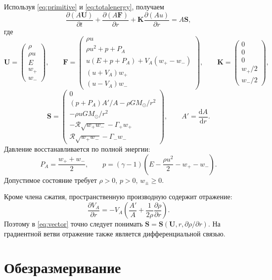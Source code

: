 \documentclass[11pt,a4paper]{article}
\newcommand{\PA}{P_A}
\newcommand{\VA}{V_A}
\newcommand{\Rref}{\mathcal R}
\newcommand{\dd}{\mathrm d}
\providecommand{\U}{}
\renewcommand{\U}{\bm U}
\newcommand{\F}{\bm F}
\newcommand{\Src}{\bm S}
\begin{document}
Используя \eqref{eq:primitive} и \eqref{eq:totalenergy}, получаем
\begin{equation}
 \frac{\partial(A\U)}{\partial t}
 +\frac{\partial(A\F)}{\partial r}
 +\bm K\frac{\partial(Au)}{\partial r}=A\Src,
 \label{eq:vector}
\end{equation}
где
\[
 \U=\begin{pmatrix}
 \rho\\ \rho u\\ E\\ w_+\\ w_-
 \end{pmatrix},\qquad
 \F=\begin{pmatrix}
 \rho u\\
 \rho u^2+p+\PA\\
 u(E+p+\PA)+\VA(w_+-w_-)\\
 (u+\VA)w_+\\
 (u-\VA)w_-
 \end{pmatrix},\qquad
 \bm K=\begin{pmatrix}
 0\\0\\0\\w_+/2\\w_-/2
 \end{pmatrix},
\]
\[
 \Src=\begin{pmatrix}
 0\\[2pt]
 (p+\PA)A'/A-\rho GM_\odot/r^2\\[2pt]
 -\rho uGM_\odot/r^2\\[2pt]
 -\Rref\sqrt{w_+w_-}-\Gamma_+w_+\\[2pt]
 \Rref\sqrt{w_+w_-}-\Gamma_-w_-
 \end{pmatrix},\qquad A'=\frac{\dd A}{\dd r}.
\]
Давление восстанавливается по полной энергии:
\[
 \PA=\frac{w_++w_-}{2},\qquad
 p=(\gamma-1)\left(E-\frac{\rho u^2}{2}-w_+-w_-\right).
\]
Допустимое состояние требует $\rho>0$, $p>0$, $w_\pm\ge0$.

Кроме члена сжатия, пространственную производную содержит отражение:
\[
 \frac{\partial\VA}{\partial r}=-\VA
 \left(\frac{A'}A+\frac1{2\rho}\frac{\partial\rho}{\partial r}\right).
\]
Поэтому в \eqref{eq:vector} точно следует понимать
$\Src=\Src(\U,r,\partial\rho/\partial r)$.
На градиентной ветви отражение также является дифференциальной связью.


\section{Обезразмеривание}
\end{document}
